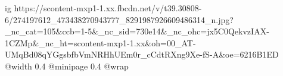  
 
 
 
 

\ifcmt
  ig https://scontent-mxp1-1.xx.fbcdn.net/v/t39.30808-6/274197612_473438270943777_8291987926609486314_n.jpg?_nc_cat=105&ccb=1-5&_nc_sid=730e14&_nc_ohc=jx5C0QekvzIAX-1CZMp&_nc_ht=scontent-mxp1-1.xx&oh=00_AT-UMqBd08qYGgsbfbVmNRHhUEm0r_cCdtRXng9Xe-fS-A&oe=6216B1ED
  @width 0.4
  @minipage 0.4
  @wrap \parpic[r]
\fi
